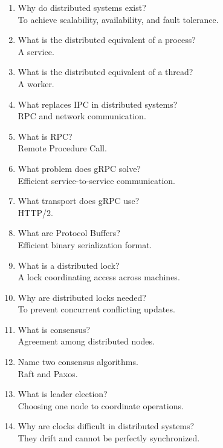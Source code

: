 \begin{enumerate}
\item Why do distributed systems exist?\\
To achieve scalability, availability, and fault tolerance.

\item What is the distributed equivalent of a process?\\
A service.

\item What is the distributed equivalent of a thread?\\
A worker.

\item What replaces IPC in distributed systems?\\
RPC and network communication.

\item What is RPC?\\
Remote Procedure Call.

\item What problem does gRPC solve?\\
Efficient service-to-service communication.

\item What transport does gRPC use?\\
HTTP/2.

\item What are Protocol Buffers?\\
Efficient binary serialization format.

\item What is a distributed lock?\\
A lock coordinating access across machines.

\item Why are distributed locks needed?\\
To prevent concurrent conflicting updates.

\item What is consensus?\\
Agreement among distributed nodes.

\item Name two consensus algorithms.\\
Raft and Paxos.

\item What is leader election?\\
Choosing one node to coordinate operations.

\item Why are clocks difficult in distributed systems?\\
They drift and cannot be perfectly synchronized.


\end{enumerate}
